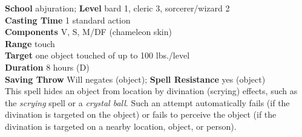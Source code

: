 \textbf{School} abjuration; \textbf{Level} bard 1, cleric 3, sorcerer/wizard 2\\
\textbf{Casting Time} 1 standard action\\
\textbf{Components} V, S, M/DF (chameleon skin)\\
\textbf{Range} touch\\
\textbf{Target} one object touched of up to 100 lbs./level\\
\textbf{Duration} 8 hours (D)\\
\textbf{Saving Throw }Will negates (object); \textbf{Spell Resistance} yes (object)\\
This spell hides an object from location by divination (scrying) effects, such as the \textit{scrying }spell or a \textit{crystal ball}. Such an attempt automatically fails (if the divination is targeted on the object) or fails to perceive the object (if the divination is targeted on a nearby location, object, or person).\\
